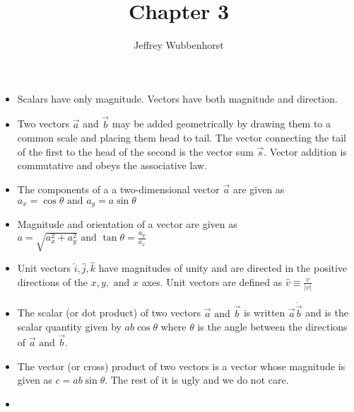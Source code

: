 \documentclass[12pt,letterpaper]{article}
\author{Jeffrey Wubbenhorst}
\title{Chapter 3}
\begin{document}
\maketitle

\begin{itemize}

\item Scalars have only magnitude. Vectors have both magnitude and direction. 

\item Two vectors $\vec{a}$ and $\vec{b}$ may be added geometrically by drawing them to a common scale and placing them head to tail. The vector connecting the tail of the first to the head of the second is the vector sum $\vec{s}$. Vector addition is commutative and obeys the associative law. 

\item The components of a a two-dimensional vector $\vec{a}$ are given as $a_x=\cos \theta \mbox{ and } a_y=a\sin \theta$ 

\item Magnitude and orientation of a vector are given as $a=\sqrt{a_x^2+a_y^2} \mbox{ and } \tan \theta=\frac{a_y}{a_x}$

\item Unit vectors $\hat{i},\hat{j},\hat{k}$ have magnitudes of unity and are directed in the positive directions of the $x,y,\mbox{ and } x$ axes. Unit vectors are defined as $\hat{v}\equiv \frac{v}{|v|}$

\item The scalar (or dot product) of two vectors $\vec{a} \mbox{ and } \vec{b}$ is written $\vec{a} \dot \vec{b}$ and is the scalar quantity given by $ab\cos \theta$ where $\theta$ is the angle between the directions of $\vec{a} \mbox{ and } \vec{b}$. 
\item The vector (or cross) product of two vectors is a vector whose magnitude is given as $c=ab\sin\theta$. The rest of it is ugly and we do not care. 



\item 


\end{itemize}
\end{document}

